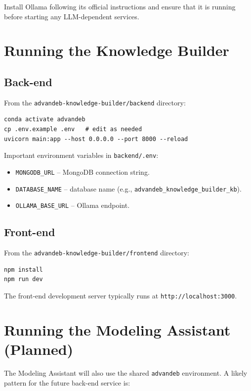 \documentclass[11pt]{article}
\begin{document}
Install Ollama following its official instructions and ensure that it is running before starting any LLM-dependent services.

\section{Running the Knowledge Builder}

\subsection{Back-end}

From the \texttt{advandeb-knowledge-builder/backend} directory:

\begin{verbatim}
conda activate advandeb
cp .env.example .env   # edit as needed
uvicorn main:app --host 0.0.0.0 --port 8000 --reload
\end{verbatim}

Important environment variables in \texttt{backend/.env}:

\begin{itemize}[noitemsep]
  \item \texttt{MONGODB\_URL} -- MongoDB connection string.
  \item \texttt{DATABASE\_NAME} -- database name (e.g., \texttt{advandeb\_knowledge\_builder\_kb}).
  \item \texttt{OLLAMA\_BASE\_URL} -- Ollama endpoint.
\end{itemize}

\subsection{Front-end}

From the \texttt{advandeb-knowledge-builder/frontend} directory:

\begin{verbatim}
npm install
npm run dev
\end{verbatim}

The front-end development server typically runs at \texttt{http://localhost:3000}.

\section{Running the Modeling Assistant (Planned)}

The Modeling Assistant will also use the shared \texttt{advandeb} environment. A likely pattern for the future back-end service is:
\end{document}
